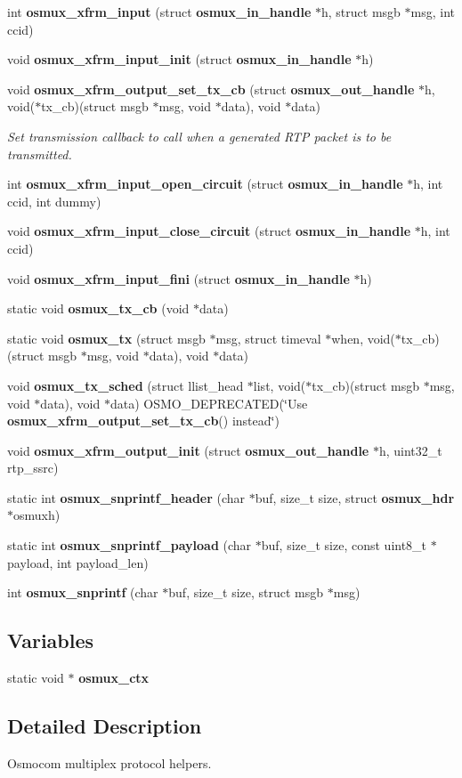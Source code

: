 \begin{DoxyCompactItemize}
\item 
int {\bf osmux\+\_\+xfrm\+\_\+input} (struct {\bf osmux\+\_\+in\+\_\+handle} $\ast$h, struct msgb $\ast$msg, int ccid)
\item 
void {\bfseries osmux\+\_\+xfrm\+\_\+input\+\_\+init} (struct {\bf osmux\+\_\+in\+\_\+handle} $\ast$h)
\item 
void {\bf osmux\+\_\+xfrm\+\_\+output\+\_\+set\+\_\+tx\+\_\+cb} (struct {\bf osmux\+\_\+out\+\_\+handle} $\ast$h, void($\ast$tx\+\_\+cb)(struct msgb $\ast$msg, void $\ast$data), void $\ast$data)
\begin{DoxyCompactList}\small\item\em Set transmission callback to call when a generated R\+TP packet is to be transmitted. \end{DoxyCompactList}\item 
int {\bfseries osmux\+\_\+xfrm\+\_\+input\+\_\+open\+\_\+circuit} (struct {\bf osmux\+\_\+in\+\_\+handle} $\ast$h, int ccid, int dummy)
\item 
void {\bfseries osmux\+\_\+xfrm\+\_\+input\+\_\+close\+\_\+circuit} (struct {\bf osmux\+\_\+in\+\_\+handle} $\ast$h, int ccid)
\item 
void {\bfseries osmux\+\_\+xfrm\+\_\+input\+\_\+fini} (struct {\bf osmux\+\_\+in\+\_\+handle} $\ast$h)
\item 
static void {\bfseries osmux\+\_\+tx\+\_\+cb} (void $\ast$data)
\item 
static void {\bfseries osmux\+\_\+tx} (struct msgb $\ast$msg, struct timeval $\ast$when, void($\ast$tx\+\_\+cb)(struct msgb $\ast$msg, void $\ast$data), void $\ast$data)
\item 
void {\bfseries osmux\+\_\+tx\+\_\+sched} (struct llist\+\_\+head $\ast$list, void($\ast$tx\+\_\+cb)(struct msgb $\ast$msg, void $\ast$data), void $\ast$data) O\+S\+M\+O\+\_\+\+D\+E\+P\+R\+E\+C\+A\+T\+ED(\char`\"{}Use {\bf osmux\+\_\+xfrm\+\_\+output\+\_\+set\+\_\+tx\+\_\+cb}() instead\char`\"{})
\item 
void {\bfseries osmux\+\_\+xfrm\+\_\+output\+\_\+init} (struct {\bf osmux\+\_\+out\+\_\+handle} $\ast$h, uint32\+\_\+t rtp\+\_\+ssrc)
\item 
static int {\bfseries osmux\+\_\+snprintf\+\_\+header} (char $\ast$buf, size\+\_\+t size, struct {\bf osmux\+\_\+hdr} $\ast$osmuxh)
\item 
static int {\bfseries osmux\+\_\+snprintf\+\_\+payload} (char $\ast$buf, size\+\_\+t size, const uint8\+\_\+t $\ast$payload, int payload\+\_\+len)
\item 
int {\bf osmux\+\_\+snprintf} (char $\ast$buf, size\+\_\+t size, struct msgb $\ast$msg)
\end{DoxyCompactItemize}
\subsection*{Variables}
\begin{DoxyCompactItemize}
\item 
static void $\ast$ {\bfseries osmux\+\_\+ctx}
\end{DoxyCompactItemize}


\subsection{Detailed Description}
Osmocom multiplex protocol helpers. 

